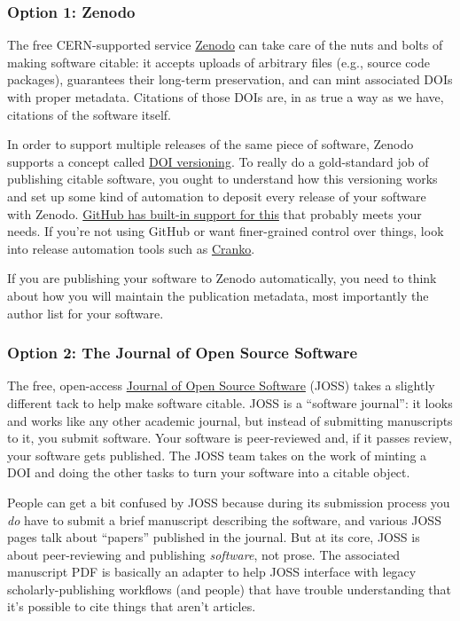 \documentclass[twocolumn]{openjournal}
\begin{document}
\subsubsection{Option 1: Zenodo}

The free CERN-supported service \href{https://about.zenodo.org/}{Zenodo} can take care of the nuts and bolts of making software citable: it accepts uploads of arbitrary files (e.g., source code packages), guarantees their long-term preservation, and can mint associated DOIs with proper metadata. Citations of those DOIs are, in as true a way as we have, citations of the software itself.

In order to support multiple releases of the same piece of software, Zenodo supports a concept called \href{https://zenodo.org/help/versioning}{DOI versioning}. To really do a gold-standard job of publishing citable software, you ought to understand how this versioning works and set up some kind of automation to deposit every release of your software with Zenodo. \href{https://docs.github.com/en/repositories/archiving-a-github-repository/referencing-and-citing-content}{GitHub has built-in support for this} that probably meets your needs. If you're not using GitHub or want finer-grained control over things, look into release automation tools such as \href{https://pkgw.github.io/cranko/book/latest/integrations/zenodo.html}{Cranko}.

If you are publishing your software to Zenodo automatically, you need to think about how you will maintain the publication metadata, most importantly the author list for your software.

\subsubsection{Option 2: The Journal of Open Source Software}

The free, open-access \href{https://joss.theoj.org/about}{Journal of Open Source Software} (JOSS) takes a slightly different tack to help make software citable. JOSS is a ``software journal'': it looks and works like any other academic journal, but instead of submitting manuscripts to it, you submit software. Your software is peer-reviewed and, if it passes review, your software gets published. The JOSS team takes on the work of minting a DOI and doing the other tasks to turn your software into a citable object.

People can get a bit confused by JOSS because during its submission process you \textit{do} have to submit a brief manuscript describing the software, and various JOSS pages talk about ``papers'' published in the journal. But at its core, JOSS is about peer-reviewing and publishing \textit{software}, not prose. The associated manuscript PDF is basically an adapter to help JOSS interface with legacy scholarly-publishing workflows (and people) that have trouble understanding that it's possible to cite things that aren't articles.
\end{document}

